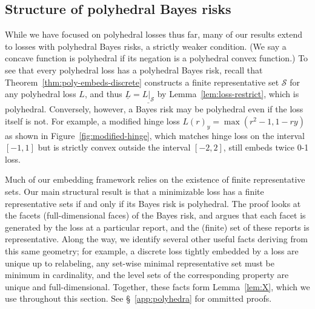 \documentclass[11pt]{article}
\newcommand{\Comments}{1}
\newcommand{\mynote}[2]{\ifnum\Comments=1\textcolor{#1}{#2}\fi}
\newcommand{\raf}[1]{\mynote{darkgreen}{[RF: #1]}}
\newcommand{\jessie}[1]{\mynote{teal}{[JF: #1]}}
\newcommand{\Sc}{\mathcal{S}}
\newcommand{\risk}[1]{\underline{#1}}
\begin{document}

\subsection{Structure of polyhedral Bayes risks}

While we have focused on polyhedral losses thus far, many of our results extend to losses with polyhedral Bayes risks, a strictly weaker condition.
(We say a concave function is polyhedral if its negation is a polyhedral convex function.)
To see that every polyhedral loss has a polyhedral Bayes risk, recall that Theorem~\ref{thm:poly-embeds-discrete} constructs a finite representative set $\Sc$ for any polyhedral loss $L$, and thus $\risk{L} = \risk{L|_\Sc}$ by Lemma~\ref{lem:loss-restrict}, which is polyhedral.
Conversely, however, a Bayes risk may be polyhedral even if the loss itself is not.
For example, a modified hinge loss $L(r)_y = \max(r^2-1,1-ry)$
as shown in Figure~\ref{fig:modified-hinge}, which matches hinge loss on the interval $[-1,1]$ but is strictly convex outside the interval $[-2,2]$, still embeds twice 0-1 loss.

Much of our embedding framework relies on the existence of finite representative sets.
Our main structural result is that a minimizable loss has a finite representative sets if and only if its Bayes risk is polyhedral.
The proof looks at the facets (full-dimensional faces) of the Bayes risk, and argues that each facet is generated by the loss at a particular report, and the (finite) set of these reports is representative.
Along the way, we identify several other useful facts deriving from this same geometry; for example, a discrete loss tightly embedded by a loss are unique up to relabeling, any set-wise minimal representative set must be minimum in cardinality, and the level sets of the corresponding property are unique and full-dimensional.
Together, these facts form Lemma~\ref{lem:X}, which we use throughout this section.
See \S~\ref{app:polyhedra} for ommitted proofs.
\end{document}
